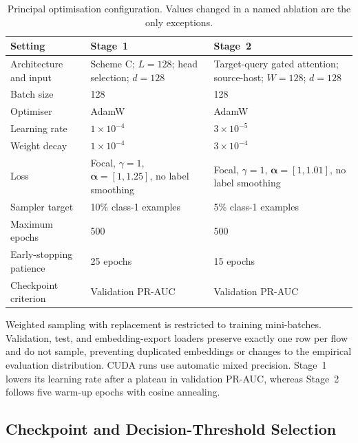 \documentclass[11pt,fleqn]{report}
\begin{document}
\begin{table}[H]
    \centering
    \caption{Principal optimisation configuration. Values changed in a named ablation are the only exceptions.}
    \label{tab:experimental_training_config}
    \begin{tabular}{@{}p{3.0cm}p{4.6cm}p{5.7cm}@{}}
        \toprule
        Setting & Stage~1 & Stage~2 \\
        \midrule
        Architecture and input & Scheme C; $L=128$; head selection; $d=128$ & Target-query gated attention; source-host; $W=128$; $d=128$ \\
        Batch size & 128 & 128 \\
        Optimiser & AdamW & AdamW \\
        Learning rate & $1\times10^{-4}$ & $3\times10^{-5}$ \\
        Weight decay & $1\times10^{-4}$ & $3\times10^{-4}$ \\
        Loss & Focal, $\gamma=1$, $\boldsymbol{\alpha}=[1,1.25]$, no label smoothing & Focal, $\gamma=1$, $\boldsymbol{\alpha}=[1,1.01]$, no label smoothing \\
        Sampler target & 10\% class-1 examples & 5\% class-1 examples \\
        Maximum epochs & 500 & 500 \\
        Early-stopping patience & 25 epochs & 15 epochs \\
        Checkpoint criterion & Validation PR-AUC & Validation PR-AUC \\
        \bottomrule
    \end{tabular}
\end{table}

Weighted sampling with replacement is restricted to training mini-batches. Validation, test, and embedding-export loaders preserve exactly one row per flow and do not sample, preventing duplicated embeddings or changes to the empirical evaluation distribution. CUDA runs use automatic mixed precision. Stage~1 lowers its learning rate after a plateau in validation PR-AUC, whereas Stage~2 follows five warm-up epochs with cosine annealing.

\subsection{Checkpoint and Decision-Threshold Selection}
\label{subsubsec:experimental_thresholding}
\end{document}
